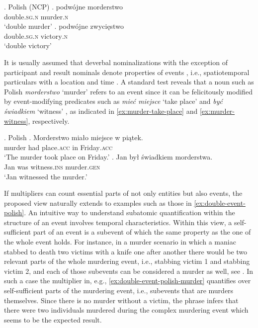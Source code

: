 \ex. Polish (NCP)\label{ex:double-event-polish}
\ag. podwójne morderstwo\\
double\textsc{.sg.n} murder\textsc{.n}\\
`double murder'\label{ex:double-event-polish-murder}
\bg. podwójne zwycięstwo\\
double\textsc{.sg.n} victory\textsc{.n}\\
`double victory'\label{ex:double-event-polish-victory}

It is usually assumed that deverbal nominalizations with the exception of participant and result nominals denote properties of events \citep[e.g.,][]{grimshaw2011deverbal}, i.e., spatiotemporal particulars with a location and time \citep{davidson1967logical}. A standard test  reveals that a noun such as Polish \textit{morderstwo} `murder' refers to an event since it can be felicitously modified by event-modifying predicates such as \textit{mieć miejsce} `take place' and \textit{być świadkiem} `witness' \citep[e.g.,][]{grimshaw1990argument}, as indicated in \ref{ex:murder-take-place} and \ref{ex:murder-witness}, respectively. 

\ex. Polish\label{ex:murder-take-place-witness}
\ag. Morderstwo miało miejsce w piątek.\\
murder had place\textsc{.acc} in Friday\textsc{.acc}\\
`The murder took place on Friday.'\label{ex:murder-take-place}
\bg. Jan był świadkiem morderstwa.\\
Jan was witness\textsc{.ins} murder\textsc{.gen}\\
`Jan witnessed the murder.'\label{ex:murder-witness}

\pagebreak If multipliers can count essential parts of not only entities but also events, the proposed view naturally extends to examples such as those in \ref{ex:double-event-polish}. An intuitive way to understand subatomic quantification within the structure of an event involves temporal characteristics. Within this view, a self-sufficient part of an event is a subevent of which the same property as the one of the whole event holds. For instance, in a murder scenario in which a maniac stabbed to death two victims with a knife one after another there would be two relevant parts of the whole murdering event, i.e., stabbing victim 1 and stabbing victim 2, and each of those subevents can be considered a murder as well, see  . In such a case the multiplier in, e.g., \ref{ex:double-event-polish-murder} quantifies over self-sufficient parts of the murdering event, i.e., subevents that are murders themselves. Since there is no murder without a victim, the phrase infers that there were two individuals murdered during the complex murdering event which seems to be the expected result.

